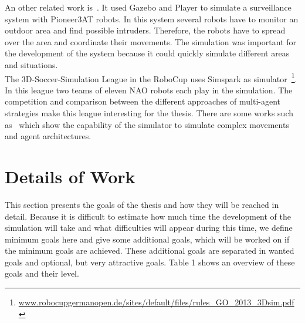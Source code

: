 \documentclass[11pt,a4paper,titlepage]{article}
\begin{document}
An other related work is~\cite{SurveillanceSystem}. It used Gazebo and Player to simulate a surveillance system with Pioneer3AT robots. In this system several robots have to monitor an outdoor area and find possible intruders. Therefore, the robots have to spread over the area and coordinate their movements. The simulation was important for the development of the system because it could quickly simulate different areas and situations.\\
The 3D-Soccer-Simulation League in the RoboCup uses Simspark as simulator~\footnote{\url{www.robocupgermanopen.de/sites/default/files/rules_GO_2013_3Dsim.pdf}}. In this league two teams of eleven NAO robots each play in the simulation. The competition and comparison between the different approaches of multi-agent strategies make this league interesting for the thesis. There are some works such as~\cite{SoccerChampion} which show the capability of the simulator to simulate complex movements and agent architectures.

\section{Details of Work}
This section presents the goals of the thesis and how they will be reached in detail. Because it is difficult to estimate how much time the development of the simulation will take and what difficulties will appear during this time, we define minimum goals here and give some additional goals, which will be worked on if the minimum goals are achieved. These additional goals are separated in wanted goals and optional, but very attractive goals. Table 1 shows an overview of these goals and their level.
\end{document}
